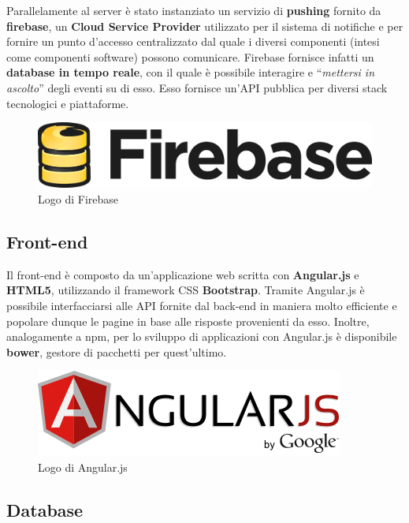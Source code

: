 Parallelamente al server è stato instanziato un servizio di \textbf{pushing} fornito da \textbf{firebase}, un \textbf{\gls{Cloud Service Provider}} utilizzato per il sistema di notifiche e per fornire un punto d'accesso centralizzato dal quale i diversi componenti (intesi come componenti software) possono comunicare. Firebase fornisce infatti un \textbf{database in tempo reale}, con il quale è possibile interagire e ``\textit{mettersi in ascolto}'' degli eventi su di esso. Esso fornisce un'API pubblica per diversi stack tecnologici e piattaforme.

\begin{figure}[htpd]
\centering
\includegraphics[width=\textwidth/2]{../immagini/firebase-logo}
\caption{Logo di Firebase}
\end{figure}

\subsection{Front-end}

Il front-end è composto da un'applicazione web scritta con \textbf{\gls{Angular.js}} e \textbf{\gls{HTML5}}, utilizzando il framework CSS \textbf{\gls{Bootstrap}}. Tramite Angular.js è possibile interfacciarsi alle API fornite dal back-end in maniera molto efficiente e popolare dunque le pagine in base alle risposte provenienti da esso. Inoltre, analogamente a npm, per lo sviluppo di applicazioni con Angular.js è disponibile \textbf{bower}, gestore di pacchetti per quest'ultimo.

\begin{figure}[htpd]
\centering
\includegraphics[width=\textwidth/2]{../immagini/angular-js-logo}
\caption{Logo di Angular.js}
\end{figure}

\subsection{Database}

